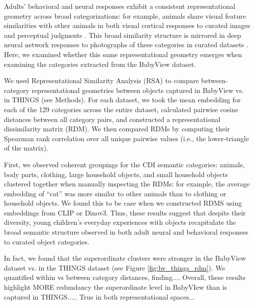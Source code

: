 Adults' behavioral and neural responses exhibit a consistent representational geometry across broad categorizations: for example, animals share visual feature similarities with other animals in both visual cortical responses to curated images and perceptual judgments \citep{konkle2013tripartite, kriegeskorte2008representational, hebart2023things, long2018mid}. This broad similarity structure is mirrored in deep neural network responses to photographs of these categories in curated datasets \citep{muttenthaler2021thingsvision, conwell2024large}. Here, we examined whether this same representational geometry emerges when examining the categories extracted from the BabyView dataset. 

We used Representational Similarity Analysis (RSA) to compare between-category representational geometries between objects captured in BabyView vs. in THINGS (see Methods).  For each dataset, we took the mean embedding for each of the 129 categories across the entire dataset, calculated pairwise cosine distances between all category pairs, and constructed a representational dissimilarity matrix (RDM). We then compared RDMs by computing their Spearman rank correlation over all unique pairwise values (i.e., the lower-triangle of the matrix).  

First, we observed coherent groupings for the CDI semantic categories: animals, body parts, clothing, large household objects, and small household objects clustered together when manually inspecting the RDMs: for example, the average embedding of ``cat'' was more similar to other animals than to clothing or household objects. We found this to be case when we constructed RDMS using embeddings from CLIP or Dinov3.  Thus, these results suggest that despite their diversity, young children's everyday experiences with objects recapitulate the broad semantic structure observed in both adult neural and behavioral responses to curated object categories.


In fact, we found that the superordinate clusters were stronger in the BabyView dataset vs. in the THINGS dataset (see Figure \ref{fig:bv_things_rdm}).   We quantified within vs between category distances, finding....
Overall, these results highlight MORE redundancy the superordinate level in BabyVIew than is captured in THINGS.....
True in both representational spaces...
 


